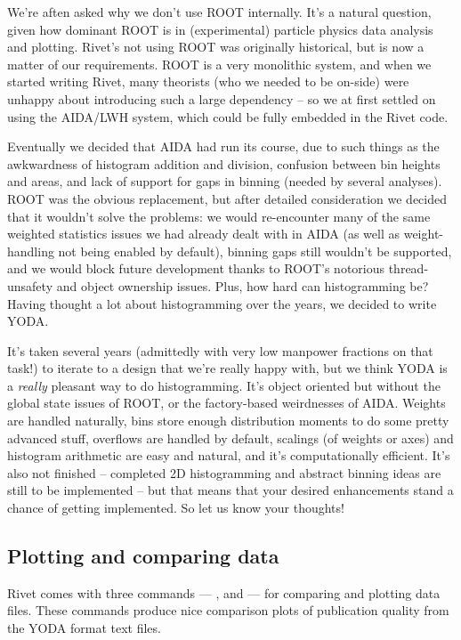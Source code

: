 \begin{detail}
  We're aften asked why we don't use ROOT internally. It's a natural question,
  given how dominant ROOT is in (experimental) particle physics data analysis
  and plotting. Rivet's not using ROOT was originally historical, but is now a
  matter of our requirements. ROOT is a very monolithic system, and when we
  started writing Rivet, many theorists (who we needed to be on-side) were
  unhappy about introducing such a large dependency -- so we at first settled on
  using the AIDA/LWH system, which could be fully embedded in the Rivet code.

  Eventually we decided that AIDA had run its course, due to such things as the
  awkwardness of histogram addition and division, confusion between bin heights
  and areas, and lack of support for gaps in binning (needed by several
  analyses). ROOT was the obvious replacement, but after detailed consideration
  we decided that it wouldn't solve the problems: we would re-encounter many of
  the same weighted statistics issues we had already dealt with in AIDA (as well
  as weight-handling not being enabled by default), binning gaps still wouldn't
  be supported, and we would block future development thanks to ROOT's notorious
  thread-unsafety and object ownership issues. Plus, how hard can histogramming
  be? Having thought a lot about histogramming over the years, we decided to
  write YODA.

  It's taken several years (admittedly with very low manpower fractions on that
  task!) to iterate to a design that we're really happy with, but we think YODA
  is a \emph{really} pleasant way to do histogramming. It's object oriented but
  without the global state issues of ROOT, or the factory-based weirdnesses of
  AIDA. Weights are handled naturally, bins store enough distribution moments to
  do some pretty advanced stuff, overflows are handled by default, scalings (of
  weights or axes) and histogram arithmetic are easy and natural, and it's
  computationally efficient. It's also not finished -- completed 2D
  histogramming and abstract binning ideas are still to be implemented -- but
  that means that your desired enhancements stand a chance of getting
  implemented. So let us know your thoughts!
\end{detail}


\subsection{Plotting and comparing data}
\label{sec:plotting}
Rivet comes with three commands --- ,  and
 --- for comparing and plotting data files. These commands
produce nice comparison plots of publication quality from the YODA format text
files.

